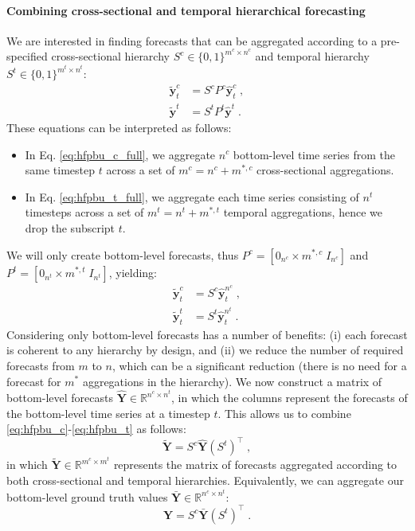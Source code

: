 \documentclass[preprint, 3p, times, twocolumn]{elsarticle}
\begin{document}
\paragraph{Combining cross-sectional and temporal hierarchical forecasting} We are interested in finding forecasts that can be aggregated according to a pre-specified cross-sectional hierarchy \(S^c \in \{0, 1\}^{m^c \times n^c}\) and temporal hierarchy \(S^t \in \{0, 1\}^{m^t \times n^t}\):
\begin{align} 
  \tilde{\textbf{y}}^c_{t} &= S^c P^c \hat{\textbf{y}}^c_{t} \;, \label{eq:hfpbu_c_full} \\
  \tilde{\textbf{y}}^t &= S^t P^t \hat{\textbf{y}}^t \;. \label{eq:hfpbu_t_full}
\end{align}
These equations can be interpreted as follows:
\begin{itemize}
  \item In Eq. \eqref{eq:hfpbu_c_full}, we aggregate \(n^c\) bottom-level time series from the same timestep \(t\) across a set of \(m^c = n^c + m^{*, c}\) cross-sectional aggregations.
  \item In Eq. \eqref{eq:hfpbu_t_full}, we aggregate each time series consisting of \(n^t\) timesteps across a set of \(m^t = n^t + m^{*, t}\) temporal aggregations, hence we drop the subscript \(t\).
\end{itemize}
We will only create bottom-level forecasts, thus \(P^c = [0_{n^c} \times m^{*, c} \; I_{n^c}] \) and \(P^t = [0_{n^t} \times m^{*, t} \; I_{n^t}] \), yielding:
\begin{align} 
  \tilde{\textbf{y}}^c_{t} &= S^c \hat{\textbf{y}}^{n^c}_{t} \;, \label{eq:hfpbu_c} \\
  \tilde{\textbf{y}}^t_{t} &= S^t \hat{\textbf{y}}^{n^t}_{t} \;. \label{eq:hfpbu_t}
\end{align}
Considering only bottom-level forecasts has a number of benefits: (i) each forecast is coherent to any hierarchy by design, and (ii) we reduce the number of required forecasts from \(m\) to \(n\), which can be a significant reduction (there is no need for a forecast for \(m^*\) aggregations in the hierarchy). 
We now construct a matrix of bottom-level forecasts \(\hat{\textbf{Y}} \in \mathbb{R}^{n^c \times n^t}\), in which the columns represent the forecasts of the bottom-level time series at a timestep \(t\). This allows us to combine \eqref{eq:hfpbu_c}-\eqref{eq:hfpbu_t} as follows:
\begin{equation}
  \tilde{\textbf{Y}} = S^c \hat{\textbf{Y}} (S^t)^\intercal \;, \label{eq:hfp_tc} 
\end{equation}
in which \(\tilde{\textbf{Y}} \in \mathbb{R}^{m^c \times m^t}\) represents the matrix of forecasts aggregated according to both cross-sectional and temporal hierarchies. Equivalently, we can aggregate our bottom-level ground truth values \(\bar{\textbf{Y}} \in \mathbb{R}^{n^c \times n^t}\):
\begin{equation}
  \textbf{Y} = S^c \bar{\textbf{Y}} (S^t)^\intercal \;. \label{eq:hfp_tc_gt} 
\end{equation}
\end{document}
